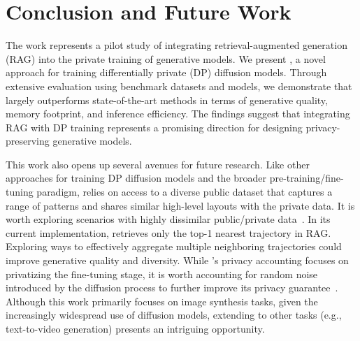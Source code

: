 


\section{Conclusion and Future Work}

The work represents a pilot study of integrating retrieval-augmented generation (RAG) into the private training of generative models. We present \system, a novel approach for training differentially private (DP) diffusion models. Through extensive evaluation using benchmark datasets and models, we demonstrate that \system largely outperforms state-of-the-art methods in terms of generative quality, memory footprint, and inference efficiency. The findings suggest that integrating RAG with DP training represents a promising direction for designing privacy-preserving generative models.

This work also opens up several avenues for future research. 
Like other approaches for training DP diffusion models and the broader pre-training/fine-tuning paradigm, \system relies on access to a diverse public dataset that captures a range of patterns and shares similar high-level layouts with the private data. It is worth exploring scenarios with highly dissimilar public/private data~\citep{liu2021leveraging,liu2021iterative,fuentes2024joint}.
 In its current implementation, \system retrieves only the top-1 nearest trajectory in RAG. Exploring ways to effectively aggregate multiple neighboring trajectories could improve generative quality and diversity.  While \system's privacy accounting focuses on privatizing the fine-tuning stage, it is worth accounting for random noise introduced by the diffusion process to further improve its privacy guarantee~\citep{wangdp}.  Although this work primarily focuses on image synthesis tasks, given the increasingly widespread use of diffusion models, extending \system to other tasks (e.g., text-to-video generation) presents an intriguing opportunity. 



